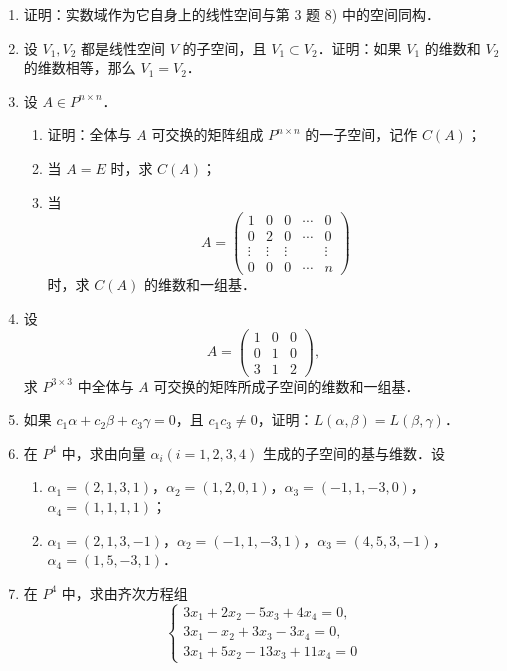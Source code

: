 \begin{enumerate}
  \anscompute
  \item 证明：实数域作为它自身上的线性空间与第 3 题 8) 中的空间同构．
  \ansproof
  \item 设 $V_1,V_2$ 都是线性空间 $V$ 的子空间，且 $V_1\subset V_2$．证明：如果 $V_1$ 的维数和 $V_2$ 的维数相等，那么 $V_1=V_2$．
  \ansproof
  \item 设 $A\in P^{n\times n}$．
  \begin{enumerate}
    \item 证明：全体与 $A$ 可交换的矩阵组成 $P^{n\times n}$ 的一子空间，记作 $C(A)$；
  \anssub
    \item 当 $A=E$ 时，求 $C(A)$；
  \anssub
    \item 当
    \[
      A=\begin{pmatrix}
        1&0&0&\cdots&0\\
        0&2&0&\cdots&0\\
        \vdots&\vdots&\vdots&&\vdots\\
        0&0&0&\cdots&n
      \end{pmatrix}
    \]
    时，求 $C(A)$ 的维数和一组基．
  \anssub
  \end{enumerate}
  \item 设
  \[
    A=\begin{pmatrix}
      1&0&0\\
      0&1&0\\
      3&1&2
    \end{pmatrix},
  \]
  求 $P^{3\times 3}$ 中全体与 $A$ 可交换的矩阵所成子空间的维数和一组基．
  \anscompute
  \item 如果 $c_1\alpha+c_2\beta+c_3\gamma=0$，且 $c_1c_3\ne 0$，证明：$L(\alpha,\beta)=L(\beta,\gamma)$．
  \ansproof
  \item 在 $P^4$ 中，求由向量 $\alpha_i(i=1,2,3,4)$ 生成的子空间的基与维数．设
  \begin{enumerate}
    \item $\alpha_1=(2,1,3,1)$，$\alpha_2=(1,2,0,1)$，$\alpha_3=(-1,1,-3,0)$，$\alpha_4=(1,1,1,1)$；
  \anssub
    \item $\alpha_1=(2,1,3,-1)$，$\alpha_2=(-1,1,-3,1)$，$\alpha_3=(4,5,3,-1)$，$\alpha_4=(1,5,-3,1)$．
  \anssub
  \end{enumerate}
  \item 在 $P^4$ 中，求由齐次方程组
  \[
    \begin{cases}
      3x_1+2x_2-5x_3+4x_4=0,\\
      3x_1-x_2+3x_3-3x_4=0,\\
      3x_1+5x_2-13x_3+11x_4=0
    \end{cases}
\]
\end{enumerate}
